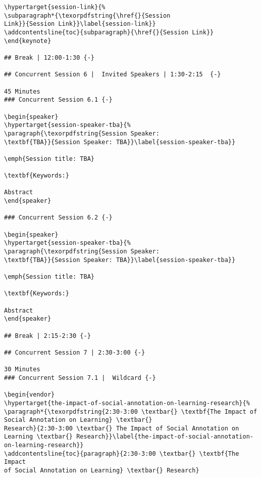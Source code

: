 \documentclass[
]{book}
\begin{document}
\begin{verbatim}
\hypertarget{session-link}{%
\subparagraph*{\texorpdfstring{\href{}{Session
Link}}{Session Link}}\label{session-link}}
\addcontentsline{toc}{subparagraph}{\href{}{Session Link}}
\end{keynote}

## Break | 12:00-1:30 {-}

## Concurrent Session 6 |  Invited Speakers | 1:30-2:15  {-}

45 Minutes
### Concurrent Session 6.1 {-}

\begin{speaker}
\hypertarget{session-speaker-tba}{%
\paragraph{\texorpdfstring{Session Speaker:
\textbf{TBA}}{Session Speaker: TBA}}\label{session-speaker-tba}}

\emph{Session title: TBA}

\textbf{Keywords:}

Abstract
\end{speaker}

### Concurrent Session 6.2 {-}

\begin{speaker}
\hypertarget{session-speaker-tba}{%
\paragraph{\texorpdfstring{Session Speaker:
\textbf{TBA}}{Session Speaker: TBA}}\label{session-speaker-tba}}

\emph{Session title: TBA}

\textbf{Keywords:}

Abstract
\end{speaker}

## Break | 2:15-2:30 {-}

## Concurrent Session 7 | 2:30-3:00 {-}

30 Minutes
### Concurrent Session 7.1 |  Wildcard {-}

\begin{vendor}
\hypertarget{the-impact-of-social-annotation-on-learning-research}{%
\paragraph*{\texorpdfstring{2:30-3:00 \textbar{} \textbf{The Impact of
Social Annotation on Learning} \textbar{}
Research}{2:30-3:00 \textbar{} The Impact of Social Annotation on Learning \textbar{} Research}}\label{the-impact-of-social-annotation-on-learning-research}}
\addcontentsline{toc}{paragraph}{2:30-3:00 \textbar{} \textbf{The Impact
of Social Annotation on Learning} \textbar{} Research}


\end{verbatim}
\end{document}
